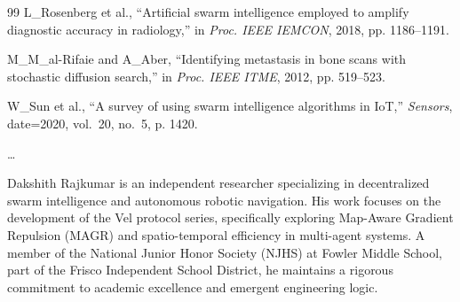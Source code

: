 \documentclass[letterpaper, 10pt, conference]{IEEEtran}
\begin{document}
\begin{thebibliography}{99}
L\_Rosenberg et al., ``Artificial swarm intelligence employed to amplify diagnostic accuracy in radiology,'' in \emph{Proc. IEEE IEMCON}, 2018, pp. 1186--1191.

M\_M\_al-Rifaie and A\_Aber, ``Identifying metastasis in bone scans with stochastic diffusion search,'' in \emph{Proc. IEEE ITME}, 2012, pp. 519--523.

W\_Sun et al., ``A survey of using swarm intelligence algorithms in {IoT},'' \emph{Sensors}, date={2020}, vol.~20, no.~5, p. 1420.

\dots

\end{thebibliography}

\begin{IEEEbiographynophoto}{Dakshith Rajkumar}
is an independent researcher specializing in decentralized swarm intelligence and autonomous robotic navigation. His work focuses on the development of the Vel protocol series, specifically exploring Map-Aware Gradient Repulsion (MAGR) and spatio-temporal efficiency in multi-agent systems. A member of the National Junior Honor Society (NJHS) at Fowler Middle School, part of the Frisco Independent School District, he maintains a rigorous commitment to academic excellence and emergent engineering logic.
\end{IEEEbiographynophoto}
\end{document}
